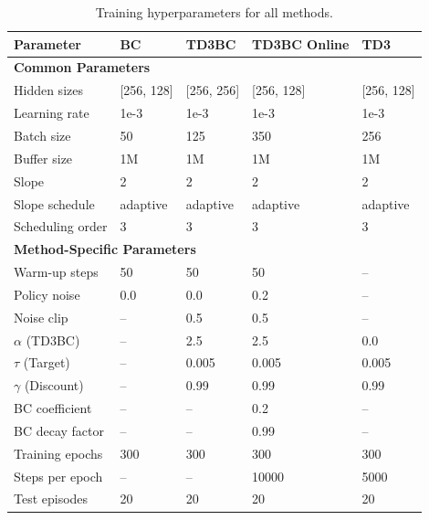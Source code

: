 \begin{table}[htbp]
\centering
\caption{Training hyperparameters for all methods.}
\label{tab:hyperparameters}
\begin{tabular}{lllll}
\toprule
\textbf{Parameter} & \textbf{BC} & \textbf{TD3BC} & \textbf{TD3BC Online} & \textbf{TD3} \\
\midrule
\multicolumn{5}{l}{\textbf{Common Parameters}} \\
\midrule
Hidden sizes        & [256, 128] & [256, 256] & [256, 128] & [256, 128] \\
Learning rate       & 1e-3       & 1e-3       & 1e-3       & 1e-3       \\
Batch size          & 50         & 125        & 350        & 256        \\
Buffer size         & 1M         & 1M         & 1M         & 1M         \\
Slope               & 2          & 2          & 2          & 2          \\
Slope schedule      & adaptive   & adaptive   & adaptive   & adaptive   \\
Scheduling order    & 3          & 3          & 3          & 3          \\
\midrule
\multicolumn{5}{l}{\textbf{Method-Specific Parameters}} \\
\midrule
Warm-up steps       & 50         & 50         & 50         & --         \\
Policy noise        & 0.0        & 0.0        & 0.2        & --         \\
Noise clip          & --         & 0.5        & 0.5        & --         \\
\(\alpha\) (TD3BC)  & --         & 2.5        & 2.5        & 0.0        \\
\(\tau\) (Target)   & --         & 0.005      & 0.005      & 0.005      \\
\(\gamma\) (Discount) & --       & 0.99       & 0.99       & 0.99       \\
BC coefficient      & --         & --         & 0.2        & --         \\
BC decay factor     & --         & --         & 0.99       & --         \\
Training epochs     & 300        & 300        & 300        & 300        \\
Steps per epoch     & --         & --         & 10000      & 5000       \\
Test episodes       & 20         & 20         & 20         & 20         \\
\bottomrule
\end{tabular}
\end{table}
